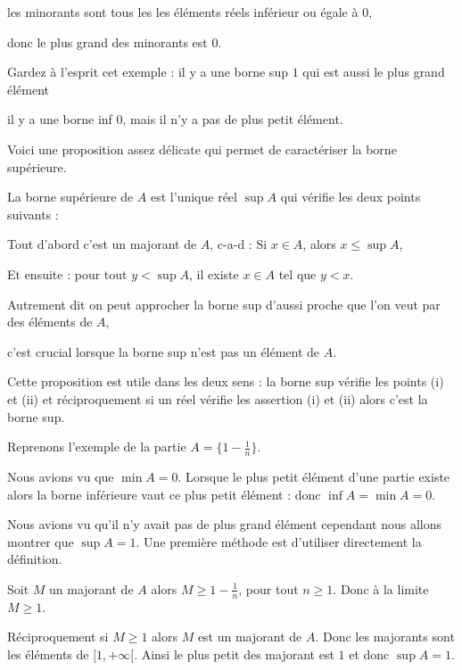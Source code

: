 les minorants sont tous les les éléments réels inférieur ou égale à $0$,

\change

 donc le plus grand des minorants est $0$.

Gardez à l'esprit cet exemple : il y a une borne sup $1$ qui est aussi le plus grand élément

il y a une borne inf $0$, mais il n'y a pas de plus petit élément. 


\diapo

Voici une proposition assez délicate qui permet de caractériser la borne supérieure.

La borne supérieure de $A$ est l'unique réel $\sup A$ qui vérifie les deux points suivants :

Tout d'abord c'est un majorant de $A$, c-a-d : Si $x\in A$, alors $x\leq \sup A$,

Et ensuite : pour tout $y<\sup A$, il existe $x\in A$ tel que $y<x$. 

Autrement dit on peut approcher la borne sup d'aussi proche que l'on veut par des éléments de $A$,

c'est crucial lorsque la borne sup n'est pas un élément de $A$.

Cette proposition est utile dans les deux sens :
la borne sup vérifie les points (i) et (ii) et
réciproquement si un réel vérifie les assertion (i) et (ii) alors c'est la borne sup. 

\change

Reprenons l'exemple de la partie $A=\big\{ 1-\frac{1}{n}\big\}$.

\change

Nous avions vu que $\min A = 0$. Lorsque le plus petit élément d'une partie existe alors
la borne inférieure vaut ce plus petit élément : donc $\inf A= \min A=0$.

\change

Nous avions vu qu'il n'y avait pas de plus grand élément cependant nous allons montrer que 
$\sup A=1$. Une première méthode est d'utiliser directement la définition.

\change

 Soit $M$ un majorant de $A$ alors $M \ge 1-\frac 1n$, pour tout $n\ge 1$.
Donc à la limite $M \ge 1$. 

\change

Réciproquement si $M\ge 1$ alors $M$ est un majorant de $A$.
Donc les majorants sont les éléments de $[1,+\infty[$. 
Ainsi le plus petit des majorant est $1$ et donc $\sup A=1$.

